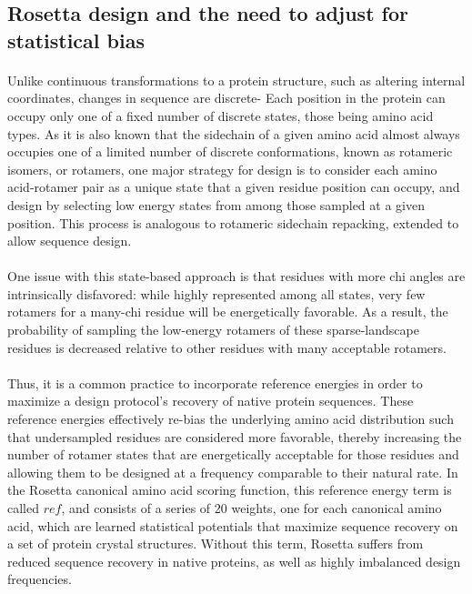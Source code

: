 \subsection{Rosetta design and the need to adjust for statistical bias}
\paragraph{}
Unlike continuous transformations to a protein structure, such as altering internal coordinates, changes in sequence are discrete- Each position in the protein can occupy only one of a fixed number of discrete states, those being amino acid types.
As it is also known that the sidechain of a given amino acid almost always occupies one of a limited number of discrete conformations, known as rotameric isomers, or rotamers, one major strategy for design is to consider each amino acid-rotamer pair as a unique state that a given residue position can occupy, and design by selecting low energy states from among those sampled at a given position\cite{leaver-fay_chapter_2011}.
This process is analogous to rotameric sidechain repacking, extended to allow sequence design.

\paragraph{}
One issue with this state-based approach is that residues with more chi angles are intrinsically disfavored: while highly represented among all states, very few rotamers for a many-chi residue will be energetically favorable.
As a result, the probability of sampling the low-energy rotamers of these sparse-landscape residues is decreased relative to other residues with many acceptable rotamers\cite{leaver-fay_chapter_2013,rohl_protein_2004}.

\paragraph{}
Thus, it is a common practice to incorporate reference energies in order to maximize a design protocol's recovery of native protein sequences.
These reference energies effectively re-bias the underlying amino acid distribution such that undersampled residues are considered more favorable, thereby increasing the number of rotamer states that are energetically acceptable for those residues and allowing them to be designed at a frequency comparable to their natural rate. 
In the Rosetta canonical amino acid scoring function, this reference energy term is called $ref$, and consists of a series of 20 weights, one for each canonical amino acid, which are learned statistical potentials that maximize sequence recovery on a set of protein crystal structures. Without this term, Rosetta suffers from reduced sequence recovery in native proteins, as well as highly imbalanced design frequencies\cite{rohl_protein_2004}.

